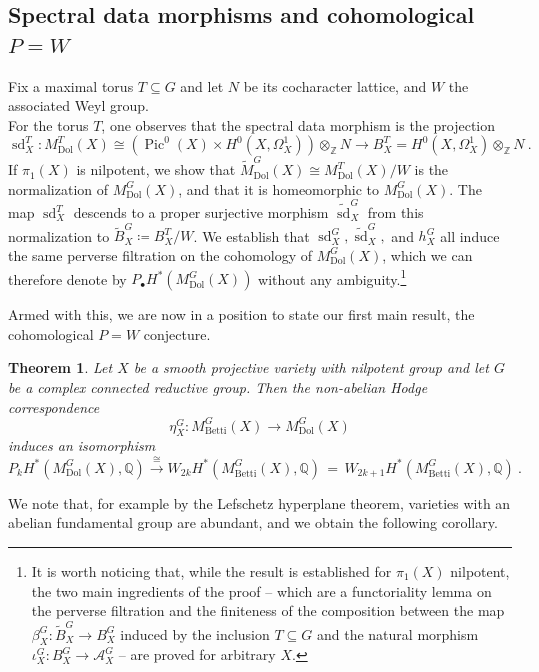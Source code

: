 \documentclass[11pt, a4paper]{amsart}
\newtheorem{theorem}{Theorem}[section]
\theoremstyle{definition}
\theoremstyle{myitemstyle}
\newcommand{\Z}{\mathbb{Z}}
\newcommand{\Q}{\mathbb{Q}}
\DeclareMathOperator{\Pic}{Pic}
\newcommand{\Dol}{{\mathrm{Dol}}}
\newcommand{\Betti}{{\mathrm{Betti}}}
\newcommand{\sd}{{\operatorname{sd}}}
\begin{document}
\subsection*{Spectral data morphisms and cohomological $P=W$}
Fix a maximal torus $T\subseteq G$ and let $N$ be its cocharacter lattice, and $W$ the associated Weyl group. \\
For the torus $T$, one observes  that the spectral data morphism is  the projection
\[
\sd^T_X\colon M_{\Dol}^T(X)\cong \left(\Pic^0(X)\times H^0(X,\Omega^1_X)\right)\otimes_{\Z}N\rightarrow B^T_X= H^0(X,\Omega^1_X)\otimes_{\Z}N\ .
\]
If $\pi_1(X)$ is nilpotent, we show that $\widetilde M_{\Dol}^G(X)\cong M_{\Dol}^T(X)/W$ is the normalization of $M_{\Dol}^G(X)$, and that it is homeomorphic to $M_\Dol^G(X)$. The map $\sd^T_X$ descends to a proper surjective morphism $\widetilde{\sd}^G_X$ from this normalization to $\widetilde{B}^G_X\coloneqq B^T_X/W$. 
We establish that $\sd^G_X,\widetilde{\sd}_X^G,$ and $h^G_X$ all induce the same perverse filtration on the cohomology of $M_{\Dol}^G(X)$, which we can therefore  denote by $P_{\bullet}H^*(M_{\Dol}^G(X))$ without any ambiguity.\footnote{It is worth noticing that, while the result is established for $\pi_1(X)$ nilpotent, the two main ingredients of the proof -- which are a functoriality lemma on the perverse filtration and the finiteness of the composition between the map $\beta^G_X\colon \widetilde{B}^G_X\to B^G_X$ induced by the inclusion $T\subseteq G$ and the natural morphism $\iota^G_X\colon B^G_X\rightarrow \mathcal{A}^G_X$ -- are proved for arbitrary $X$.} 


Armed with this, we are now in a position to state our first main result,  the cohomological $P=W$ conjecture.

\begin{theorem}
\label{thm:P=W}
Let $X$ be a smooth projective variety with nilpotent group and let $G$ be a complex connected reductive group.
Then the  non-abelian Hodge correspondence 
\[
    \eta_X^G\colon M^G_\Betti(X)\to M^G_\Dol(X)
\]
induces an isomorphism
\[
    P_k H^*(M^G_\Dol(X),\Q) \xrightarrow{\cong}
    W_{2k} H^*(M^G_\Betti(X),\Q) \,=\,
    W_{2k+1} H^*(M^G_\Betti(X),\Q)\ .
\]
\end{theorem}

We note that, for example  by the Lefschetz hyperplane theorem, varieties with an abelian fundamental group are abundant, and we obtain the following corollary.
\end{document}
